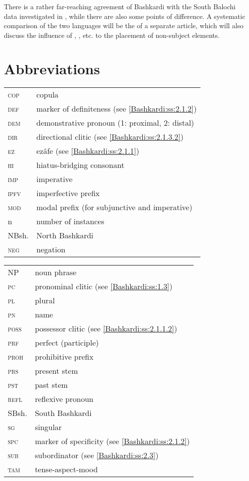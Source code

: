 \documentclass[output=paper,colorlinks,citecolor=brown]{langscibook}
\begin{document}
There is a rather far-reaching agreement of Bashkardi  with the South Balochi data investigated in \citet{Korn2022Targets}, while there are also some points of difference. A systematic comparison of the two languages will be the  of a separate article, which will also discuss the influence of , , etc. to the placement of non-subject elements. 

\section*{Abbreviations}
\begin{tabularx}{.45\textwidth}{lQ}
\textsc{cop} & {copula} \\
\textsc{def} & marker of {definiteness} (see \ref{Bashkardi:ss:2.1.2})  \\
\textsc{dem} & demonstrative {pronoun} (1: proximal, 2: distal)  \\
\textsc{dir} & directional {clitic} (see \ref{Bashkardi:ss:2.1.3.2}) \\
\textsc{ez} & ezâfe (see \ref{Bashkardi:ss:2.1.1})  \\
\textsc{hi} & hiatus-bridging consonant \\
\textsc{imp} & imperative \\
\textsc{ipfv} & imperfective prefix  \\
\textsc{mod} & modal prefix (for subjunctive and imperative)  \\
n & number of instances  \\
NBsh. & North Bashkardi  \\
\textsc{neg} & negation \\
\end{tabularx}
\begin{tabularx}{.45\textwidth}{lQ}
\textsc{NP} & noun phrase \\
\textsc{pc} & pronominal {clitic} (see \ref{Bashkardi:ss:1.3})  \\
\textsc{pl} & plural  \\
\textsc{pn} & name  \\
\textsc{poss} & possessor {clitic} (see \ref{Bashkardi:ss:2.1.1.2})  \\
\textsc{prf} & perfect (participle)  \\
\textsc{proh} & prohibitive prefix  \\
\textsc{prs} & present stem  \\
\textsc{pst} & past stem  \\
\textsc{refl} & reflexive {pronoun}  \\
SBsh. & South Bashkardi  \\
\textsc{sg} & singular  \\
\textsc{spc} & marker of {specificity} (see \ref{Bashkardi:ss:2.1.2})  \\
\textsc{sub} & subordinator (see \ref{Bashkardi:ss:2.3})  \\
\textsc{tam} & tense-aspect-mood  \\
\end{tabularx}\medskip
\end{document}
